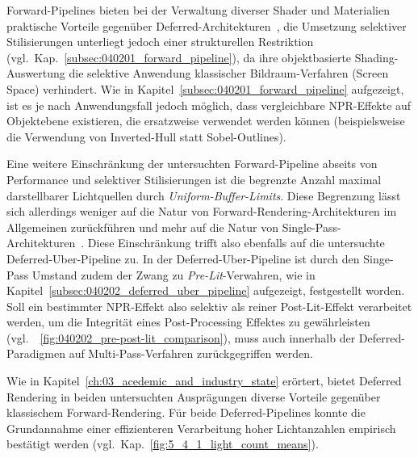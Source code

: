 Forward-Pipelines bieten bei der Verwaltung diverser Shader und Materialien praktische Vorteile
gegenüber Deferred-Architekturen~\parencite[vgl.][Abschn.~9.2]{Chapter9Deferred}, die Umsetzung selektiver Stilisierungen
unterliegt jedoch einer strukturellen Restriktion (vgl.\ Kap.~\ref{subsec:040201_forward_pipeline}), da ihre
objektbasierte Shading-Auswertung die selektive Anwendung klassischer Bildraum-Verfahren (Screen Space) verhindert.
Wie in Kapitel~\ref{subsec:040201_forward_pipeline} aufgezeigt, ist es je nach Anwendungsfall jedoch möglich, dass
vergleichbare \ac{NPR}-Effekte auf Objektebene existieren, die ersatzweise verwendet werden können (beispielsweise die
Verwendung von Inverted-Hull statt Sobel-Outlines).

Eine weitere Einschränkung der untersuchten Forward-Pipeline abseits von Performance und selektiver Stilisierungen ist
die begrenzte Anzahl maximal darstellbarer Lichtquellen durch \textit{Uniform-Buffer-Limits}.
Diese Begrenzung lässt sich allerdings weniger auf die Natur von Forward-Rendering-Architekturen im Allgemeinen
zurückführen und mehr auf die Natur von Single-Pass-Architekturen~\parencite[vgl.][Abschn.~1]{Thaler2011DeferredRendering}.
Diese Einschränkung trifft also ebenfalls auf die untersuchte Deferred-Uber-Pipeline zu.
In der Deferred-Uber-Pipeline ist durch den Singe-Pass Umstand zudem der Zwang zu \textit{Pre-Lit}-Verwahren, wie in
Kapitel~\ref{subsec:040202_deferred_uber_pipeline} aufgezeigt, festgestellt worden.
Soll ein bestimmter \ac{NPR}-Effekt also selektiv als reiner Post-Lit-Effekt verarbeitet werden, um die
Integrität eines Post-Processing Effektes zu gewährleisten (vgl.\ ~\ref{fig:040202_pre-post-lit_comparison}), muss auch
innerhalb der Deferred-Paradigmen auf Multi-Pass-Verfahren zurückgegriffen werden.

Wie in Kapitel~\ref{ch:03_acedemic_and_industry_state} erörtert, bietet Deferred Rendering in beiden untersuchten
Ausprägungen diverse Vorteile gegenüber klassischem Forward-Rendering.
Für beide Deferred-Pipelines konnte die Grundannahme einer effizienteren Verarbeitung hoher Lichtanzahlen empirisch
bestätigt werden (vgl.\ Kap.~\ref{fig:5_4_1_light_count_means}).

